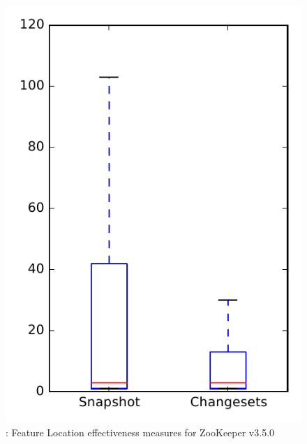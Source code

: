 
\begin{figure}
\centering
\includegraphics[height=0.4\textheight]{figures/flt/rq1_zookeeper_no_outlier}
\caption{\fone: Feature Location effectiveness measures for ZooKeeper v3.5.0}
\label{fig:flt:rq1:zookeeper}
\end{figure}
